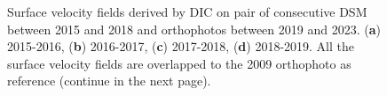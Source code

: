 \begin{figure}[!p]
{    }
    \caption{Surface velocity fields derived by DIC on pair of consecutive DSM between 2015 and 2018 and 
    orthophotos between 2019 and 2023. (\textbf{a}) 2015-2016, (\textbf{b}) 2016-2017, (\textbf{c}) 2017-2018, (\textbf{d}) 2018-2019.
    All the surface velocity fields are overlapped to the 2009 orthophoto \citep{Degaetani2021} as reference (continue in the next page).}
    \label{fig:3:dic_vel}
\end{figure}

\begin{figure}[!p]\ContinuedFloat
    \centering
\end{figure}
